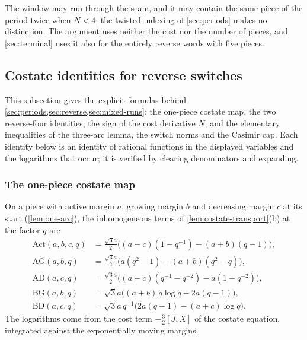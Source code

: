 The window may run through the seam, and it may contain the same piece of the period twice when
$N<4$; the twisted indexing of \cref{sec:periods} makes no distinction. The argument uses neither
the cost nor the number of pieces, and \cref{sec:terminal} uses it also for the entirely reverse
words with five pieces.

\subsection{Costate identities for reverse switches}\label{app:reverse-estimates}

This subsection gives the explicit formulas behind \cref{sec:periods,sec:reverse,sec:mixed-runs}: the one-piece
costate map, the two reverse-four identities, the sign of the cost derivative $N$, and the
elementary inequalities of the three-arc lemma, the switch norms and the Casimir cap. Each
identity below is an identity of rational functions in the displayed variables and the
logarithms that occur; it is verified by clearing denominators and expanding.

\subsubsection{The one-piece costate map}\label{app:rev-one-arc}

On a piece with active margin $a$, growing margin $b$ and decreasing margin $c$ at its start
(\cref{lem:one-arc}), the inhomogeneous terms of \cref{lem:costate-transport}(b) at the factor
$q$ are
\begin{align*}
  \mathrm{Act}(a,b,c,q)&=\tfrac{\sqrt3a}{2}\bigl((a+c)(1-q^{-1})-(a+b)(q-1)\bigr),\\
  \mathrm{AG}(a,b,q)&=\tfrac{\sqrt3a}{2}\bigl(a(q^2-1)-(a+b)(q^2-q)\bigr),\\
  \mathrm{AD}(a,c,q)&=\tfrac{\sqrt3a}{2}\bigl((a+c)(q^{-1}-q^{-2})-a(1-q^{-2})\bigr),\\
  \mathrm{BG}(a,b,q)&=\sqrt3a\bigl((a+b)\,q\log q-2a(q-1)\bigr),\\
  \mathrm{BD}(a,c,q)&=\sqrt3a\,q^{-1}\bigl(2a(q-1)-(a+c)\log q\bigr).
\end{align*}
The logarithms come from the cost term $-\frac32[J,X]$ of the costate
equation, integrated against the exponentially moving margins.

